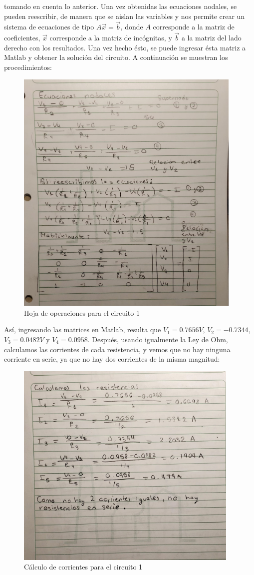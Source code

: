 \documentclass[12pt, letterpaper]{report}
\begin{document}
tomando en cuenta lo anterior. Una vez obtenidas las ecuaciones nodales, se pueden reescribir, de manera que se aislan las variables y nos permite crear un sistema de ecuaciones de tipo $A\vec{x} = \vec{b}$, donde 
$A$ corresponde a la matriz de coeficientes, $\vec{x}$ corresponde a la matriz de incógnitas, y $\vec{b}$ a la matriz del lado derecho con los resultados. Una vez hecho ésto, se puede ingresar ésta matriz 
a Matlab y obtener la solución del circuito. A continuación se muestran los procedimientos: 
\begin{figure}[H]
    \centering
    \includegraphics[height = 12cm]{Operaciones_1.jpeg}
    \caption{Hoja de operaciones para el circuito 1}
\end{figure}
Así, ingresando las matrices en Matlab, resulta que $V_1 = 0.7656V$, $V_2 = -0.7344$, $V_3 = 0.0482V$ y $V_4 = 0.0958$. Después, usando igualmente la Ley de Ohm, calculamos las corrientes de cada resistencia, y vemos 
que no hay ninguna corriente en serie, ya que no hay dos corrientes de la misma magnitud: 
\begin{figure}[H]
    \centering
    \includegraphics[height = 10cm]{Corrientes 1.jpeg}
    \caption{Cálculo de corrientes para el circuito 1}
\end{figure}
\end{document}
